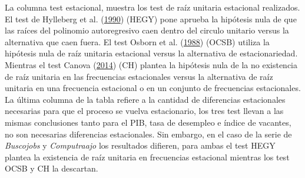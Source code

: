 \documentclass[12pt,oneside]{reedthesis}
\begin{document}
La columna test estacional, muestra los test de raíz unitaria estacional realizados. El test de Hylleberg et al. (\protect\hyperlink{ref-hegy1990}{1990}) (HEGY) pone aprueba la hipótesis nula de que las raíces del polinomio autoregresivo caen dentro del circulo unitario versus la alternativa que caen fuera. El test Osborn et al. (\protect\hyperlink{ref-Osborn1988}{1988}) (OCSB) utiliza la hipótesis nula de raíz unitaria estacional versus la alternativa de estacionariedad. Mientras el test Canova (\protect\hyperlink{ref-Canova1995}{2014}) (CH) plantea la hipótesis nula de la no existencia de raíz unitaria en las frecuencias estacionales versus la alternativa de raíz unitaria en una frecuencia estacional o en un conjunto de frecuencias estacionales. La última columna de la tabla refiere a la cantidad de diferencias estacionales necesarias para que el proceso se vuelva estacionario, los tres test llevan a las mismas conclusiones tanto para el PIB, tasa de desempleo e índice de vacantes, no son necesarias diferencias estacionales. Sin embargo, en el caso de la serie de \emph{Buscojobs} y \emph{Computraajo} los resultados difieren, para ambas el test HEGY plantea la existencia de raíz unitaria en frecuencias estacional mientras los test OCSB y CH la descartan.
\end{document}
